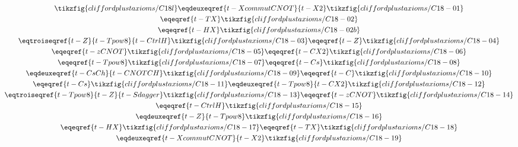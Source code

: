 \begin{derivation}\label{lem:t-C18-dec-eq}
\begin{gather*}
    \tikzfig{cliffordplustaxioms/C18l}
    \eqdeuxeqref{t-XcommutCNOT}{t-X2}\tikzfig{cliffordplustaxioms/C18-01}\\
    \eqeqref{t-TX}\tikzfig{cliffordplustaxioms/C18-02}\\
    \eqeqref{t-HX}\tikzfig{cliffordplustaxioms/C18-02b}\\
    \eqtroiseqref{t-Z}{t-Tpow8}{t-CtrlH}\tikzfig{cliffordplustaxioms/C18-03}
    \eqeqref{t-Z}\tikzfig{cliffordplustaxioms/C18-04}\\
    \eqeqref{t-zCNOT}\tikzfig{cliffordplustaxioms/C18-05}
    \eqeqref{t-CX2}\tikzfig{cliffordplustaxioms/C18-06}\\
    \eqeqref{t-Tpow8}\tikzfig{cliffordplustaxioms/C18-07}
    \eqeqref{t-Cs}\tikzfig{cliffordplustaxioms/C18-08}\\
    \eqdeuxeqref{t-CsCh}{t-CNOTCH}\tikzfig{cliffordplustaxioms/C18-09}
    \eqeqref{t-C}\tikzfig{cliffordplustaxioms/C18-10}\\
    \eqeqref{t-Cs}\tikzfig{cliffordplustaxioms/C18-11}
    \eqdeuxeqref{t-Tpow8}{t-CX2}\tikzfig{cliffordplustaxioms/C18-12}\\
    \eqtroiseqref{t-Tpow8}{t-Z}{t-Sdagger}\tikzfig{cliffordplustaxioms/C18-13}
    \eqeqref{t-zCNOT}\tikzfig{cliffordplustaxioms/C18-14}\\
    \eqeqref{t-CtrlH}\tikzfig{cliffordplustaxioms/C18-15}\\
    \eqdeuxeqref{t-Z}{t-Tpow8}\tikzfig{cliffordplustaxioms/C18-16}\\
    \eqeqref{t-HX}\tikzfig{cliffordplustaxioms/C18-17}
    \eqeqref{t-TX}\tikzfig{cliffordplustaxioms/C18-18}\\
    \eqdeuxeqref{t-XcommutCNOT}{t-X2}\tikzfig{cliffordplustaxioms/C18-19}
\end{gather*}
\end{derivation}

